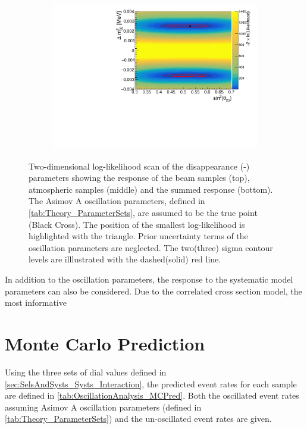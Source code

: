 \begin{figure}[h]
\begin{subfigure}[t]{1.0\textwidth}
    \includegraphics[width=\textwidth, trim={0mm 0mm 0mm 0mm}, clip,page=3]{Figures/OA/DisappearanceScans.pdf}
  \end{subfigure}
  \caption{Two-dimensional log-likelihood scan of the disappearance (\sinsqatm-\delmsqatm) parameters showing the response of the beam samples (top), atmospheric samples (middle) and the summed response (bottom). The Asimov A oscillation parameters, defined in \autoref{tab:Theory_ParameterSets}, are assumed to be the true point (Black Cross). The position of the smallest log-likelihood is highlighted with the triangle. Prior uncertainty terms of the oscillation parameters are neglected. The two(three) sigma contour levels are illlustrated with the dashed(solid) red line.}
  \label{fig:OscillationAnalysis_2DLLHOscScans_Dis}
\end{figure}

In addition to the oscillation parameters, the response to the systematic model parameters can also be considered. Due to the correlated cross section model, the most informative 

\section{Monte Carlo Prediction}
\label{sec:OscillationAnalysis_MonteCarloPred}

Using the three sets of dial values defined in \autoref{sec:SelsAndSysts_Systs_Interaction}, the predicted event rates for each sample are defined in \autoref{tab:OscillationAnalysis_MCPred}. Both the oscillated event rates assuming Asimov A oscillation parameters (defined in \autoref{tab:Theory_ParameterSets}) and the un-oscillated event rates are given.

